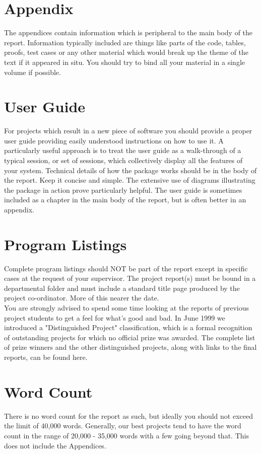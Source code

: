 \documentclass[12pt,twoside]{article}
\begin{document}
\newpage

\section{Appendix}
The appendices contain information which is peripheral to the main body of the report. Information typically included are things like parts of the code, tables, proofs, test cases or any other material which would break up the theme of the text if it appeared in situ. You should try to bind all your material in a single volume if possible.\\

\newpage

\section{User Guide}
For projects which result in a new piece of software you should provide a proper user guide providing easily understood instructions on how to use it. A particularly useful approach is to treat the user guide as a walk-through of a typical session, or set of sessions, which collectively display all the features of your system. Technical details of how the package works should be in the body of the report. Keep it concise and simple. The extensive use of diagrams illustrating the package in action prove particularly helpful. The user guide is sometimes included as a chapter in the main body of the report, but is often better in an appendix.\\


\newpage

\section{Program Listings}
Complete program listings should NOT be part of the report except in specific cases at the request of your supervisor. The project report(s) must be bound in a departmental folder and must include a standard title page produced by the project co-ordinator. More of this nearer the date.\\
You are strongly advised to spend some time looking at the reports of previous project students to get a feel for what's good and bad. In June 1999 we introduced a "Distinguished Project" classification, which is a formal recognition of outstanding projects for which no official prize was awarded. The complete list of prize winners and the other distinguished projects, along with links to the final reports, can be found here.\\

\newpage

\section{Word Count}
There is no word count for the report as such, but ideally you should not exceed the limit of 40,000 words. Generally, our best projects tend to have the word count in the range of 20,000 - 35,000 words with a few going beyond that. This does not include the Appendices.\\





\end{document}
